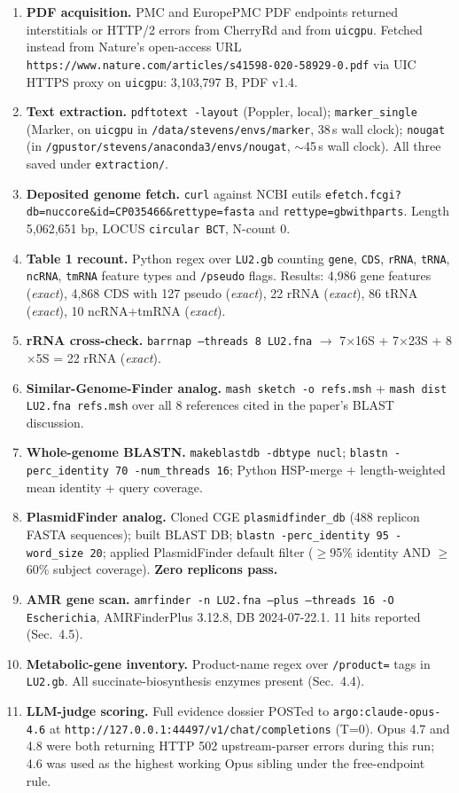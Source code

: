 \documentclass[11pt,letterpaper]{article}
\begin{document}
\begin{enumerate}
  \item \textbf{PDF acquisition.} PMC and EuropePMC PDF endpoints returned interstitials or HTTP/2 errors from CherryRd and from \texttt{uicgpu}. Fetched instead from Nature's open-access URL \\ \texttt{https://www.nature.com/articles/s41598-020-58929-0.pdf} via UIC HTTPS proxy on \texttt{uicgpu}: 3{,}103{,}797 B, PDF v1.4.
  \item \textbf{Text extraction.} \texttt{pdftotext -layout} (Poppler, local); \texttt{marker\_single} (Marker, on \texttt{uicgpu} in \texttt{/data/stevens/envs/marker}, 38\,s wall clock); \texttt{nougat} (in \texttt{/gpustor/stevens/anaconda3/envs/nougat}, $\sim$45\,s wall clock). All three saved under \texttt{extraction/}.
  \item \textbf{Deposited genome fetch.} \texttt{curl} against NCBI eutils \texttt{efetch.fcgi?db=nuccore\&id=CP035466\&rettype=fasta} and \texttt{rettype=gbwithparts}. Length 5{,}062{,}651 bp, LOCUS \texttt{circular BCT}, N-count 0.
  \item \textbf{Table 1 recount.} Python regex over \texttt{LU2.gb} counting \texttt{gene}, \texttt{CDS}, \texttt{rRNA}, \texttt{tRNA}, \texttt{ncRNA}, \texttt{tmRNA} feature types and \texttt{/pseudo} flags. Results: 4{,}986 gene features (\emph{exact}), 4{,}868 CDS with 127 pseudo (\emph{exact}), 22 rRNA (\emph{exact}), 86 tRNA (\emph{exact}), 10 ncRNA+tmRNA (\emph{exact}).
  \item \textbf{rRNA cross-check.} \texttt{barrnap --threads 8 LU2.fna} $\rightarrow$ 7$\times$16S + 7$\times$23S + 8$\times$5S = 22 rRNA (\emph{exact}).
  \item \textbf{Similar-Genome-Finder analog.} \texttt{mash sketch -o refs.msh} + \texttt{mash dist LU2.fna refs.msh} over all 8 references cited in the paper's BLAST discussion.
  \item \textbf{Whole-genome BLASTN.} \texttt{makeblastdb -dbtype nucl}; \texttt{blastn -perc\_identity 70 -num\_threads 16}; Python HSP-merge $+$ length-weighted mean identity + query coverage.
  \item \textbf{PlasmidFinder analog.} Cloned CGE \texttt{plasmidfinder\_db} (488 replicon FASTA sequences); built BLAST DB; \texttt{blastn -perc\_identity 95 -word\_size 20}; applied PlasmidFinder default filter ($\geq$95\% identity AND $\geq$60\% subject coverage). \textbf{Zero replicons pass.}
  \item \textbf{AMR gene scan.} \texttt{amrfinder -n LU2.fna --plus --threads 16 -O Escherichia}, AMRFinderPlus 3.12.8, DB 2024-07-22.1. 11 hits reported (Sec.\ 4.5).
  \item \textbf{Metabolic-gene inventory.} Product-name regex over \texttt{/product=} tags in \texttt{LU2.gb}. All succinate-biosynthesis enzymes present (Sec.\ 4.4).
  \item \textbf{LLM-judge scoring.} Full evidence dossier POSTed to \texttt{argo:claude-opus-4.6} at \texttt{http://127.0.0.1:44497/v1/chat/completions} (T=0). Opus 4.7 and 4.8 were both returning HTTP 502 upstream-parser errors during this run; 4.6 was used as the highest working Opus sibling under the free-endpoint rule.
\end{enumerate}
\end{document}
